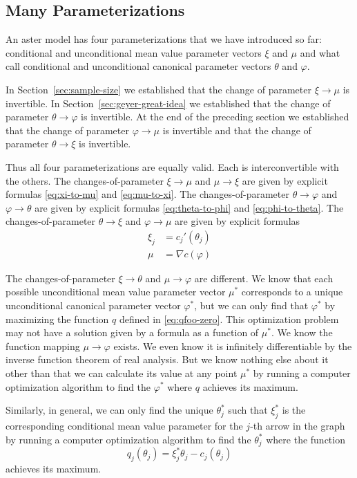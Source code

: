 \documentclass[11pt]{article}
\begin{document}
\subsection{Many Parameterizations}

An aster model has four parameterizations that we have introduced so far:
conditional and unconditional mean value parameter vectors $\xi$ and $\mu$
and what \citet{aster1} call conditional and unconditional canonical parameter
vectors $\theta$ and $\varphi$.

In Section~\ref{sec:sample-size} we established that the change of parameter
$\xi \to \mu$ is invertible.
In Section~\ref{sec:geyer-great-idea} we established that
the change of parameter $\theta \to \varphi$ is invertible.
At the end of the preceding section we established that
the change of parameter $\varphi \to \mu$ is invertible
and that the change of parameter $\theta \to \xi$ is invertible.

Thus all four parameterizations are
equally valid.  Each is interconvertible with the others.
The changes-of-parameter $\xi \to \mu$ and $\mu \to \xi$ are given by
explicit formulas \eqref{eq:xi-to-mu} and \eqref{eq:mu-to-xi}.
The changes-of-parameter $\theta \to \varphi$ and $\varphi \to \theta$
are given by
explicit formulas \eqref{eq:theta-to-phi} and \eqref{eq:phi-to-theta}.
The changes-of-parameter $\theta \to \xi$ and $\varphi \to \mu$
are given by explicit formulas
\begin{align*}
   \xi_j & = c_j'(\theta_j)
   \\
   \mu & = \nabla c(\varphi)
\end{align*}

The changes-of-parameter $\xi \to \theta$ and $\mu \to \varphi$ are different.
We know that each possible unconditional mean value parameter vector $\mu^*$
corresponds to a unique unconditional canonical parameter vector $\varphi^*$,
but we can only find that $\varphi^*$ by maximizing the function $q$ defined
in \eqref{eq:qfoo-zero}.  This optimization problem may not have a solution
given by a formula as a function of $\mu^*$.  We know the function mapping
$\mu \to \varphi$ exists.  We even know it is infinitely differentiable by
the inverse function theorem of real analysis.  But we know nothing else about
it other than that we can calculate its value at any point $\mu^*$ by running
a computer optimization algorithm to find the $\varphi^*$ where $q$ achieves
its maximum.

Similarly, in general, we can only find the unique $\theta_j^*$
such that $\xi_j^*$ is the corresponding conditional mean value parameter for
the $j$-th arrow in the graph by running a computer optimization algorithm
to find the $\theta_j^*$ where the function
$$
   q_j(\theta_j) = \xi_j^* \theta_j - c_j(\theta_j)
$$
achieves its maximum.
\end{document}
